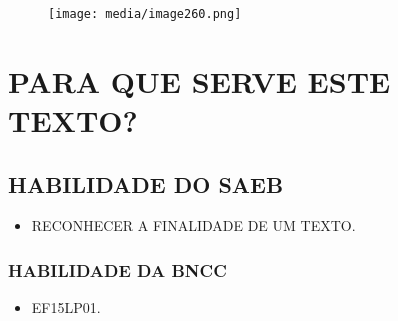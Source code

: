 \begin{figure}[H]
\centering
\texttt{[image: media/image260.png]}
\end{figure}

\chapter{PARA QUE SERVE ESTE TEXTO?}

\section*{HABILIDADE DO SAEB}

\begin{itemize}
\item \uppercase{Reconhecer a finalidade de um texto.}
\end{itemize}

\subsection{HABILIDADE DA BNCC}

\begin{itemize}
\item EF15LP01.
\end{itemize}

